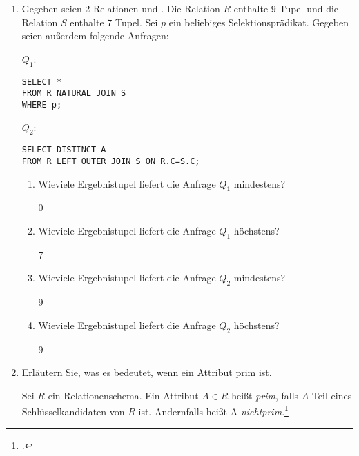 \documentclass{bschlangaul-aufgabe}
\begin{document}
\begin{enumerate}
\item Gegeben seien 2 Relationen  und
. Die Relation $R$ enthalte $9$ Tupel und die
Relation $S$ enthalte $7$ Tupel. Sei $p$ ein beliebiges
Selektionsprädikat.
Gegeben seien außerdem folgende Anfragen:

$Q_1$:

\begin{verbatim}
SELECT *
FROM R NATURAL JOIN S
WHERE p;
\end{verbatim}

$Q_2$:

\begin{verbatim}
SELECT DISTINCT A
FROM R LEFT OUTER JOIN S ON R.C=S.C;
\end{verbatim}

\begin{enumerate}
\item Wieviele Ergebnistupel liefert die Anfrage $Q_1$ mindestens?

\begin{bAntwort}
0
\end{bAntwort}

\item Wieviele Ergebnistupel liefert die Anfrage $Q_1$ höchstens?

\begin{bAntwort}
7
\end{bAntwort}

\item Wieviele Ergebnistupel liefert die Anfrage $Q_2$ mindestens?

\begin{bAntwort}
9
\end{bAntwort}

\item Wieviele Ergebnistupel liefert die Anfrage $Q_2$ höchstens?

\begin{bAntwort}
9
\end{bAntwort}
\end{enumerate}


\item Erläutern Sie, was es bedeutet, wenn ein Attribut prim ist.

\begin{bAntwort}
Sei $R$ ein Relationenschema. Ein Attribut $A \in R$ heißt \emph{prim},
falls $A$ Teil eines Schlüsselkandidaten von $R$ ist. Andernfalls heißt
A \emph{nichtprim}.\footcite[Seite 191]{winter}
\end{bAntwort}


\end{enumerate}
\end{document}
